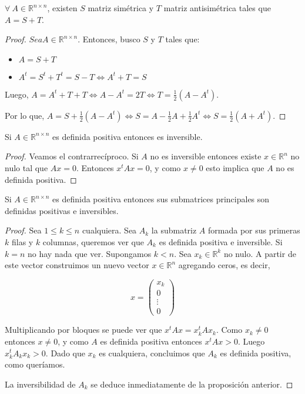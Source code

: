 \begin{propo}
	$\forall\ A \in \mathbb{R}^{n \times n}$, existen $S$ matriz simétrica y $T$
	matriz antisimétrica tales que $A = S + T$.

	\begin{proof} $Sea A \in \mathbb{R}^{n \times n}$. Entonces, busco $S$ y $T$ tales que:
	\begin{itemize}
		\item $A = S + T$
		\item $A^t = S^t + T^t = S - T \iff A^t + T = S$
	\end{itemize}

	Luego, $A = A^t + T + T \iff A - A^t = 2T \iff T = \frac{1}{2}(A - A^t)$.

	Por lo que, $A = S + \frac{1}{2}(A - A^t) \iff S = A - \frac{1}{2}A +\frac{1}{2}A^t
		\iff S = \frac{1}{2}(A + A^t)$.
	\end{proof}
\end{propo}

\begin{propo}
Si $A \in \mathbb{R}^{n \times n}$ es definida positiva entonces es inversible.

\begin{proof}
Veamos el contrarrecíproco. Si $A$ no es inversible entonces existe $x \in \mathbb{R}^n$ no nulo tal que $Ax = 0$. Entonces $x^t A x = 0$, y como $x \neq 0$ esto implica que $A$ no es definida positiva.
\end{proof}
\end{propo}

\begin{propo}
\label{propo:defpos}
Si $A \in \mathbb{R}^{n \times n}$ es definida positiva entonces sus submatrices principales son definidas positivas e inversibles.

\begin{proof}
Sea $1 \leq k \leq n$ cualquiera. Sea $A_k$ la submatriz $A$ formada por sus primeras $k$ filas y $k$ columnas, queremos ver que $A_k$ es definida positiva e inversible. Si $k = n$ no hay nada que ver. Supongamos $k < n$. Sea $x_k \in \mathbb{R}^k$ no nulo. A partir de este vector construimos un nuevo vector $x \in \mathbb{R}^n$ agregando ceros, es decir,

\[x = \begin{pmatrix}
x_k\\
0 \\
\vdots \\
0
\end{pmatrix}\]

Multiplicando por bloques se puede ver que $x^t A x = x_k^t A x_k$. Como $x_k \neq 0$ entonces $x \neq 0$, y como $A$ es definida positiva entonces $x^t A x > 0$. Luego $x_k^t A_k x_k > 0$. Dado que $x_k$ es cualquiera, concluimos que $A_k$ es definida positiva, como queríamos.

La inversibilidad de $A_k$ se deduce inmediatamente de la proposición anterior.

\end{proof}
\end{propo}

